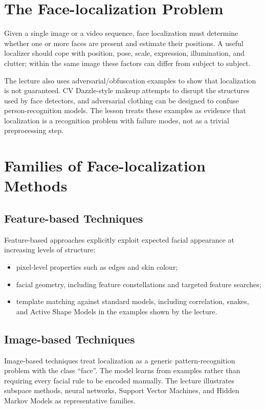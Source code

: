 \documentclass[11pt,a4paper,oneside]{report}
\begin{document}
\section{The Face-localization Problem}
\label{sec:face-localization-problem}

Given a single image or a video sequence, face localization must determine
whether one or more faces are present and estimate their positions.  A useful
localizer should cope with position, pose, scale, expression, illumination, and
clutter; within the same image these factors can differ from subject to subject.

The lecture also uses adversarial/obfuscation examples to show that localization
is not guaranteed.  CV Dazzle-style makeup attempts to disrupt the structures
used by face detectors, and adversarial clothing can be designed to confuse
person-recognition models.  The lesson treats these examples as evidence that
localization is a recognition problem with failure modes, not as a trivial
preprocessing step.

\section{Families of Face-localization Methods}

\subsection{Feature-based Techniques}

Feature-based approaches explicitly exploit expected facial appearance at
increasing levels of structure:
\begin{itemize}
    \item pixel-level properties such as edges and skin colour;
    \item facial geometry, including feature constellations and targeted feature
          searches;
    \item template matching against standard models, including correlation,
          snakes, and Active Shape Models in the examples shown by the lecture.
\end{itemize}

\subsection{Image-based Techniques}

Image-based techniques treat localization as a generic pattern-recognition
problem with the class ``face''.  The model learns from examples rather than
requiring every facial rule to be encoded manually.  The lecture illustrates
subspace methods, neural networks, Support Vector Machines, and Hidden Markov
Models as representative families.
\end{document}
